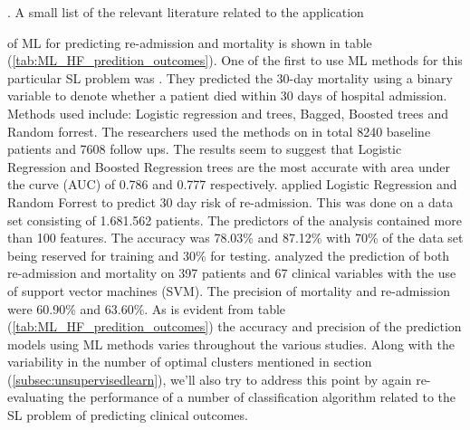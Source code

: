 \documentclass[../thesis.tex]{subfiles}
\begin{document}
\citep{ketchum2011multivariate}. A small list of the relevant literature related to the application



\noindent of ML for predicting re-admission and mortality is shown in table (\ref{tab:ML_HF_predition_outcomes}). One of the first to use ML methods for this particular SL problem was \cite{austin2012regression}. They predicted the 30-day mortality using a binary variable to denote whether a patient died within 30 days of hospital admission. Methods used include: Logistic regression and trees, Bagged, Boosted trees and Random forrest. The researchers used the methods on in total 8240 baseline patients and 7608 follow ups. The results seem to suggest that Logistic Regression and Boosted Regression trees are the most accurate with area under the curve (AUC) of 0.786 and 0.777 respectively. \cite{zolfaghar2013big} applied Logistic Regression and Random Forrest to predict 30 day risk of re-admission. This was done on a data set consisting of 1.681.562 patients. The predictors of the analysis contained more than 100 features. The accuracy was 78.03\% and 87.12\% with 70\% of the data set being reserved for training and 30\% for testing. \cite{shah2014phenomapping} analyzed the prediction of both re-admission and mortality on 397 patients and 67 clinical variables with the use of support vector machines (SVM). The precision of mortality and re-admission were 60.90\% and 63.60\%. As is evident from table (\ref{tab:ML_HF_predition_outcomes}) the accuracy and precision of the prediction models using ML methods varies throughout the various studies. Along with the variability in the number of optimal clusters mentioned in section (\ref{subsec:unsupervisedlearn}), we'll also try to address this point by again re-evaluating the performance of a number of classification algorithm related to the SL problem of predicting clinical outcomes. 
\end{document}
